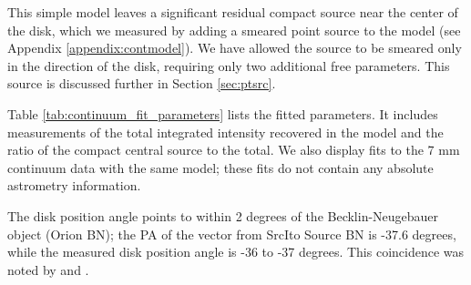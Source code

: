 \documentclass[twocolumn]{aastex61}
\newcommand{\sourcei}{SrcI}
\begin{document}
This simple model leaves a significant residual compact source near
the center of the disk, which we measured by adding a smeared point
source to the model (see Appendix \ref{appendix:contmodel}).
We have allowed the source to be smeared only in the direction
of the disk, requiring only two additional free parameters.
This source is discussed further in Section \ref{sec:ptsrc}.

Table \ref{tab:continuum_fit_parameters} lists the fitted parameters.  It 
includes measurements of the total integrated intensity recovered in the model
and the ratio of the compact central source to the total.  We also display
fits to the \citet{Reid2007a} 7 mm continuum data with the same model;
these fits do not contain any absolute astrometry information.




The disk position angle points to within 2 degrees of the Becklin-Neugebauer
object (Orion BN); the PA of the vector from \sourcei to Source BN is -37.6
degrees, while the measured disk position angle is -36 to -37 degrees.
This coincidence was noted by \citet{Bally2011a} and \citet{Goddi2011b}.

\end{document}

